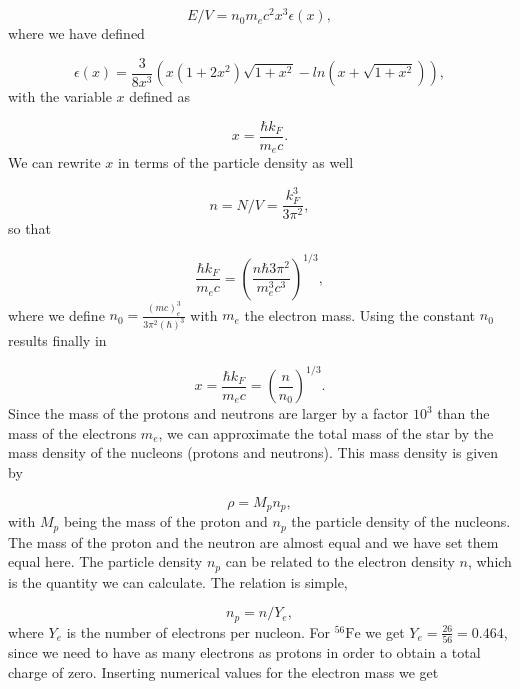 \documentclass[%
oneside,                 %
final,                   %
10pt]{article}
\begin{document}
\begin{equation*}
E/V=n_0m_ec^2x^3\epsilon (x),
\end{equation*}
where we have defined

\begin{equation*}
\epsilon (x) =
\frac{3}{8x^3}\left( x(1+2x^2)\sqrt{1+x^2}-ln(x+\sqrt{1+x^2})\right),
\end{equation*}
with the variable $x$ defined as

\begin{equation*}
x=\frac{\hbar k_F}{m_ec}.
\end{equation*}
We can rewrite $x$ in terms of the particle density as well

\begin{equation*}
n=N/V=\frac{k_{F}^{3}}{3\pi^{2}},
\end{equation*}
so that

\begin{equation*}
\frac{\hbar k_F}{m_ec}=\left(\frac{n\hbar 3\pi^2}{m_e^3c^3}\right)^{1/3},
\end{equation*}
where we define
$n_{0}=\frac{(mc)^{3}_{e}}{3\pi^2(\hbar)^{3}}$ with $m_{e}$ the electron mass.
Using the constant $n_0$ results finally in

\begin{equation*}
x=\frac{\hbar k_F}{m_ec}=\left(\frac{n}{n_{0}}\right)^{1/3}.
\end{equation*}
Since the mass of the protons and neutrons are larger by a factor $10^3$ than the mass
of the electrons $m_e$, 
we can approximate the total mass of the star by the mass density of the nucleons (protons and neutrons).
This mass density is given by

\begin{equation*}
\rho = M_p n_p,
\end{equation*}
with $M_{p}$ being the  mass of the proton and $n_p$ the particle density of the nucleons.
The mass of the proton and the neutron are almost equal and we have set them equal here.
The particle density  $n_p$ can be related to the electron density $n$, which is the quantity
we can calculate. The relation is simple,

\begin{equation*}
n_p = n/Y_e ,
\end{equation*}
where $Y_{e}$ is the number of electrons per nucleon.  For $^{56}\mbox{Fe}$  we get $Y_{e}=\frac{26}{56}=0.464$, since we 
need to have as many electrons as protons in order to obtain a total charge of zero. Inserting numerical values
for the electron mass we get
\end{document}
